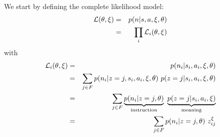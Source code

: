 We start by defining the complete likelihood model:
%
\begin{eqnarray}
\mathcal{L}(\theta,\xi) &=&  p(n|s,a,\xi,\theta)\nonumber\\
			   &=& \prod_{i} \mathcal{L}_{i}(\theta,\xi)\nonumber
\end{eqnarray}			
with
\begin{eqnarray}
\L_i(\theta,\xi) &=&  p(n_i|s_i,a_i,\xi,\theta)\nonumber\\
				&=&	\sum_{j \in F} p(n_i|z = j,s_i,a_i,\xi,\theta)~p(z = j|s_i,a_i,\xi,\theta)	\nonumber\\
				&=&	\sum_{j \in F} \underbrace{p(n_i|z = j,\theta)}_{\text{instruction}}~\underbrace{p(z = j|s_i,a_i,\xi)}_{\text{meaning}}	\nonumber\\
				&=&	\sum_{j \in F} p(n_i|z = j,\theta)~z_{ij}^{\xi}
				\label{eq:lik}
\end{eqnarray}


